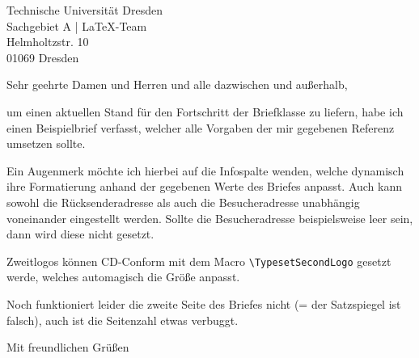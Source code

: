 \documentclass{tudcdlttr}
\begin{document}
\begin{letter}{
Technische Universität Dresden \\
Sachgebiet A | \LaTeX{}-Team \\
Helmholtzstr. 10 \\
01069 Dresden}

\opening{Sehr geehrte Damen und Herren und alle dazwischen und außerhalb,}
um einen aktuellen Stand für den Fortschritt der Briefklasse zu liefern, habe ich einen
Beispielbrief verfasst, welcher alle Vorgaben der mir gegebenen Referenz umsetzen sollte.

Ein Augenmerk möchte ich hierbei auf die Infospalte wenden, welche dynamisch ihre Formatierung anhand der gegebenen Werte
des Briefes anpasst.
Auch kann sowohl die Rücksenderadresse als auch die Besucheradresse unabhängig voneinander
eingestellt werden. Sollte die Besucheradresse beispielsweise leer sein,
dann wird diese nicht gesetzt.

Zweitlogos können CD-Conform mit dem Macro
\verb|\TypesetSecondLogo| gesetzt werde, welches automagisch die Größe anpasst.

Noch funktioniert leider die zweite Seite des Briefes nicht (= der Satzspiegel ist falsch), auch ist die Seitenzahl etwas verbuggt.

\closing{Mit freundlichen Grüßen}


\end{letter}
\end{document}
